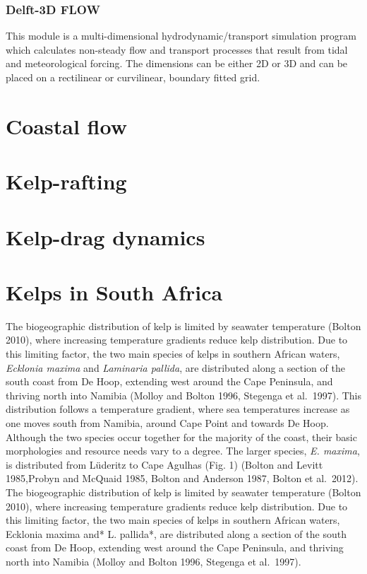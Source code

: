 \documentclass[]{article}
\begin{document}
\hypertarget{delft-3d-flow}{%
\subsubsection{Delft-3D FLOW}\label{delft-3d-flow}}

This module is a multi-dimensional hydrodynamic/transport simulation
program which calculates non-steady flow and transport processes that
result from tidal and meteorological forcing. The dimensions can be
either 2D or 3D and can be placed on a rectilinear or curvilinear,
boundary fitted grid.

\hypertarget{coastal-flow}{%
\section{Coastal flow}\label{coastal-flow}}

\hypertarget{kelp-rafting}{%
\section{Kelp-rafting}\label{kelp-rafting}}

\hypertarget{kelp-drag-dynamics}{%
\section{Kelp-drag dynamics}\label{kelp-drag-dynamics}}

\hypertarget{kelps-in-south-africa}{%
\section{Kelps in South Africa}\label{kelps-in-south-africa}}

The biogeographic distribution of kelp is limited by seawater
temperature (Bolton 2010), where increasing temperature gradients reduce
kelp distribution. Due to this limiting factor, the two main species of
kelps in southern African waters, \emph{Ecklonia maxima} and
\emph{Laminaria pallida}, are distributed along a section of the south
coast from De Hoop, extending west around the Cape Peninsula, and
thriving north into Namibia (Molloy and Bolton 1996, Stegenga et
al.~1997). This distribution follows a temperature gradient, where sea
temperatures increase as one moves south from Namibia, around Cape Point
and towards De Hoop. Although the two species occur together for the
majority of the coast, their basic morphologies and resource needs vary
to a degree. The larger species, \emph{E. maxima}, is distributed from
Lüderitz to Cape Agulhas (Fig. 1) (Bolton and Levitt 1985,Probyn and
McQuaid 1985, Bolton and Anderson 1987, Bolton et al.~2012). The
biogeographic distribution of kelp is limited by seawater temperature
(Bolton 2010), where increasing temperature gradients reduce kelp
distribution. Due to this limiting factor, the two main species of kelps
in southern African waters, Ecklonia maxima and* L. pallida*, are
distributed along a section of the south coast from De Hoop, extending
west around the Cape Peninsula, and thriving north into Namibia (Molloy
and Bolton 1996, Stegenga et al.~1997).
\end{document}
